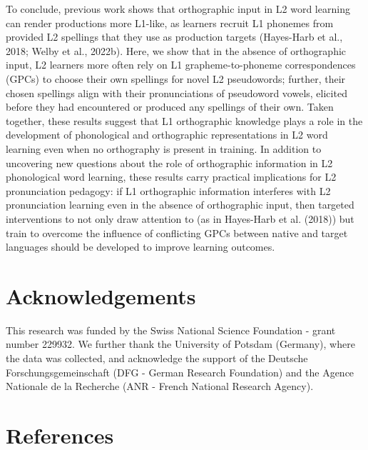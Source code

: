 \documentclass[
  english,
  man,floatsintext]{apa7}
\begin{document}
To conclude, previous work shows that orthographic input in L2 word learning can render productions more L1-like, as learners recruit L1 phonemes from provided L2 spellings that they use as production targets (Hayes-Harb et al., 2018; Welby et al., 2022b). Here, we show that in the absence of orthographic input, L2 learners more often rely on L1 grapheme-to-phoneme correspondences (GPCs) to choose their own spellings for novel L2 pseudowords; further, their chosen spellings align with their pronunciations of pseudoword vowels, elicited before they had encountered or produced any spellings of their own. Taken together, these results suggest that L1 orthographic knowledge plays a role in the development of phonological and orthographic representations in L2 word learning even when no orthography is present in training. In addition to uncovering new questions about the role of orthographic information in L2 phonological word learning, these results carry practical implications for L2 pronunciation pedagogy: if L1 orthographic information interferes with L2 pronunciation learning even in the absence of orthographic input, then targeted interventions to not only draw attention to (as in Hayes-Harb et al. (2018)) but train to overcome the influence of conflicting GPCs between native and target languages should be developed to improve learning outcomes.

\section{Acknowledgements}\label{acknowledgements}

This research was funded by the Swiss National Science Foundation - grant number 229932. We further thank the University of Potsdam (Germany), where the data was collected, and acknowledge the support of the Deutsche Forschungsgemeinschaft (DFG - German Research Foundation) and the Agence Nationale de la Recherche (ANR
- French National Research Agency).

\newpage

\section{References}\label{references}
\end{document}
